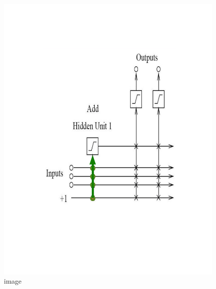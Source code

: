 \documentclass[presentation]{beamer}
\begin{document}
\begin{frame}
\begin{columns}[t]
\begin{column}{0.5\textwidth}
\begin{figure}
        \includegraphics[scale=0.28]{trainInputunit.png}
        \caption{image}
      \end{figure}			
		\end{column}
	\end{columns}
\end{frame}
\end{document}
